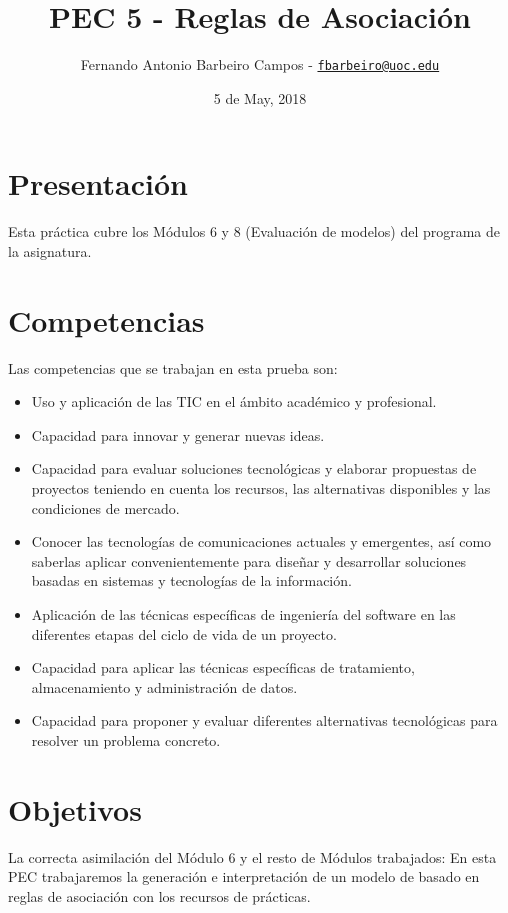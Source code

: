 \documentclass[]{article}
\title{PEC 5 - Reglas de Asociación}
\author{Fernando Antonio Barbeiro Campos -
\href{mailto:fbarbeiro@uoc.edu}{\nolinkurl{fbarbeiro@uoc.edu}}}
\date{5 de May, 2018}
\begin{document}
\maketitle

\section{Presentación}\label{presentacion}

Esta práctica cubre los Módulos 6 y 8 (Evaluación de modelos) del
programa de la asignatura.

\section{Competencias}\label{competencias}

Las competencias que se trabajan en esta prueba son:

\begin{itemize}
\item
  Uso y aplicación de las TIC en el ámbito académico y profesional.
\item
  Capacidad para innovar y generar nuevas ideas.
\item
  Capacidad para evaluar soluciones tecnológicas y elaborar propuestas
  de proyectos teniendo en cuenta los recursos, las alternativas
  disponibles y las condiciones de mercado.
\item
  Conocer las tecnologías de comunicaciones actuales y emergentes, así
  como saberlas aplicar convenientemente para diseñar y desarrollar
  soluciones basadas en sistemas y tecnologías de la información.
\item
  Aplicación de las técnicas específicas de ingeniería del software en
  las diferentes etapas del ciclo de vida de un proyecto.
\item
  Capacidad para aplicar las técnicas específicas de tratamiento,
  almacenamiento y administración de datos.
\item
  Capacidad para proponer y evaluar diferentes alternativas tecnológicas
  para resolver un problema concreto.
\end{itemize}

\section{Objetivos}\label{objetivos}

La correcta asimilación del Módulo 6 y el resto de Módulos trabajados:
En esta PEC trabajaremos la generación e interpretación de un modelo de
basado en reglas de asociación con los recursos de prácticas.
\end{document}
